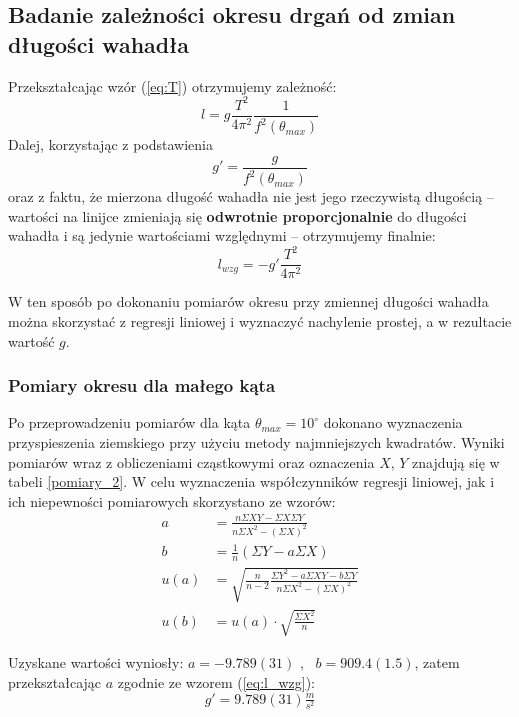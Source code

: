 \documentclass[a4paper]{article}
\newlength{\du}
\begin{document}
\subsection{Badanie zależności okresu drgań od zmian długości wahadła} %
Przekształcając wzór (\ref{eq:T})  otrzymujemy zależność:
\[l = g\frac{T^2}{4\pi^2}\frac{1}{f^2(\theta_{max})} \]
Dalej, korzystając z podstawienia \[g' = \frac{g}{f^2(\theta_{max})} \] oraz z faktu, że mierzona długość  wahadła nie jest jego rzeczywistą długością -- wartości na linijce zmieniają się \textbf{odwrotnie proporcjonalnie} do długości wahadła i są jedynie wartościami względnymi -- otrzymujemy finalnie:
\begin{equation} \label{eq:l_wzg}
 l_{wzg} = -g'\frac{T^2}{4\pi^2}
\end{equation}

W ten sposób po dokonaniu pomiarów okresu przy zmiennej długości wahadła można skorzystać z regresji liniowej i wyznaczyć nachylenie prostej, a w rezultacie wartość $g$.

\subsubsection{Pomiary okresu dla małego kąta}

Po przeprowadzeniu pomiarów dla kąta $\theta_{max} = 10^\circ$ dokonano wyznaczenia 
przyspieszenia ziemskiego przy użyciu metody najmniejszych kwadratów. 
Wyniki pomiarów wraz z obliczeniami cząstkowymi oraz oznaczenia $X$, $Y$ znajdują się w tabeli \ref{pomiary_2}.
W celu wyznaczenia współczynników regresji liniowej, jak i ich niepewności pomiarowych skorzystano ze wzorów:
\begin{align*}
a &= \frac{n \Sigma X Y - \Sigma X \Sigma Y}{n \Sigma X^2 - \left(\Sigma X\right)^2} \\
b &= \frac{1}{n}\left(\Sigma Y - a \Sigma X\right) \\
u(a) &= \sqrt{\frac{n}{n-2} \frac{\Sigma Y^2 - a\Sigma XY - b\Sigma Y}{n\Sigma X^2-\left(\Sigma X \right)^2}} \\
u(b) &= u(a)\cdot \sqrt{\frac{\Sigma X^2}{n}}
\end{align*}

Uzyskane wartości wyniosły: $a = -9.789(31)$  , \ $b = 909.4(1.5)$,
zatem przekształcając $a$ zgodnie ze wzorem (\ref{eq:l_wzg}):  \[g' = 9.789(31)  \tfrac{m}{s^2}\]
\end{document}
